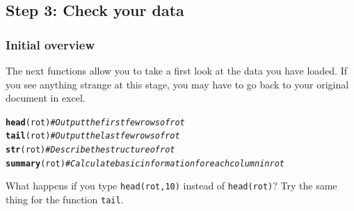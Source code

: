 \documentclass[12pt,a4paper]{article}\usepackage[]{graphicx}\usepackage[]{color}
\makeatletter
\newcommand{\hlcom}[1]{\textcolor[rgb]{0.678,0.584,0.686}{\textit{#1}}}%
\newcommand{\hlstd}[1]{\textcolor[rgb]{0.345,0.345,0.345}{#1}}%
\newcommand{\hlkwd}[1]{\textcolor[rgb]{0.737,0.353,0.396}{\textbf{#1}}}%
\newenvironment{kframe}{%
 \def\at@end@of@kframe{}%
 \ifinner\ifhmode%
  \def\at@end@of@kframe{\end{minipage}}%
  \begin{minipage}{\columnwidth}%
 \fi\fi%
 \def\FrameCommand##1{\hskip\@totalleftmargin \hskip-\fboxsep
 \colorbox{shadecolor}{##1}\hskip-\fboxsep
     \hskip-\linewidth \hskip-\@totalleftmargin \hskip\columnwidth}%
 \MakeFramed {\advance\hsize-\width
   \@totalleftmargin\z@ \linewidth\hsize
   \@setminipage}}%
 {\par\unskip\endMakeFramed%
 \at@end@of@kframe}
\newenvironment{knitrout}{}{} %
\makeatother
\begin{document}
\subsection{Step 3: Check your data}
\subsubsection{Initial overview}
The next functions allow you to take a first look at the data you have loaded. If you see anything strange at this stage, you may have to go back to your original document in excel.
\begin{knitrout}
\color{fgcolor}\begin{kframe}
\begin{alltt}
\hlkwd{head}\hlstd{(rot)} \hlcom{# Output the first few rows of rot}
\hlkwd{tail}\hlstd{(rot)} \hlcom{# Output the last few rows of rot}
\hlkwd{str}\hlstd{(rot)}  \hlcom{# Describe the structure of rot}
\hlkwd{summary}\hlstd{(rot)} \hlcom{# Calculate basic information for each column in rot}
\end{alltt}
\end{kframe}
\end{knitrout}
What happens if you type \texttt{head(rot,10)} instead of \texttt{head(rot)}? Try the same thing for the function \texttt{tail}.
\end{document}
